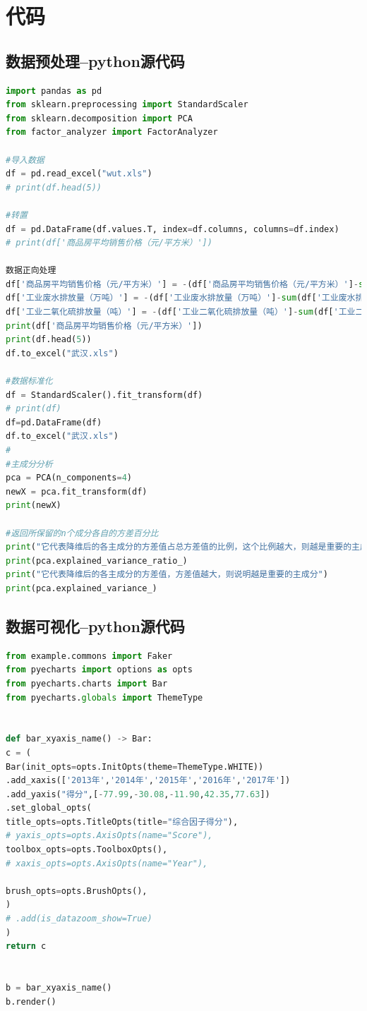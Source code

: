 \documentclass{whutmod}
\begin{document}
	\newpage
	\appendix %
\section{代码}
\subsection{数据预处理--python源代码}
\begin{lstlisting}[language=python]%这里修改语言
import pandas as pd
from sklearn.preprocessing import StandardScaler
from sklearn.decomposition import PCA
from factor_analyzer import FactorAnalyzer

#导入数据
df = pd.read_excel("wut.xls")
# print(df.head(5))

#转置
df = pd.DataFrame(df.values.T, index=df.columns, columns=df.index)
# print(df['商品房平均销售价格（元/平方米）'])

数据正向处理
df['商品房平均销售价格（元/平方米）'] = -(df['商品房平均销售价格（元/平方米）']-sum(df['商品房平均销售价格（元/平方米）'])/5)
df['工业废水排放量（万吨）'] = -(df['工业废水排放量（万吨）']-sum(df['工业废水排放量（万吨）'])/5)
df['工业二氧化硫排放量（吨）'] = -(df['工业二氧化硫排放量（吨）']-sum(df['工业二氧化硫排放量（吨）'])/5)
print(df['商品房平均销售价格（元/平方米）'])
print(df.head(5))
df.to_excel("武汉.xls")

#数据标准化
df = StandardScaler().fit_transform(df)
# print(df)
df=pd.DataFrame(df)
df.to_excel("武汉.xls")
#
#主成分分析
pca = PCA(n_components=4)
newX = pca.fit_transform(df)
print(newX)

#返回所保留的n个成分各自的方差百分比
print("它代表降维后的各主成分的方差值占总方差值的比例，这个比例越大，则越是重要的主成分")
print(pca.explained_variance_ratio_)
print("它代表降维后的各主成分的方差值，方差值越大，则说明越是重要的主成分")
print(pca.explained_variance_)

\end{lstlisting}
\subsection{数据可视化--python源代码}
\begin{lstlisting}[language=python]%这里修改语言
from example.commons import Faker
from pyecharts import options as opts
from pyecharts.charts import Bar
from pyecharts.globals import ThemeType


def bar_xyaxis_name() -> Bar:
c = (
Bar(init_opts=opts.InitOpts(theme=ThemeType.WHITE))
.add_xaxis(['2013年','2014年','2015年','2016年','2017年'])
.add_yaxis("得分",[-77.99,-30.08,-11.90,42.35,77.63])
.set_global_opts(
title_opts=opts.TitleOpts(title="综合因子得分"),
# yaxis_opts=opts.AxisOpts(name="Score"),
toolbox_opts=opts.ToolboxOpts(),
# xaxis_opts=opts.AxisOpts(name="Year"),

brush_opts=opts.BrushOpts(),
)
# .add(is_datazoom_show=True)
)
return c


b = bar_xyaxis_name()
b.render()
\end{lstlisting}
\end{document}
